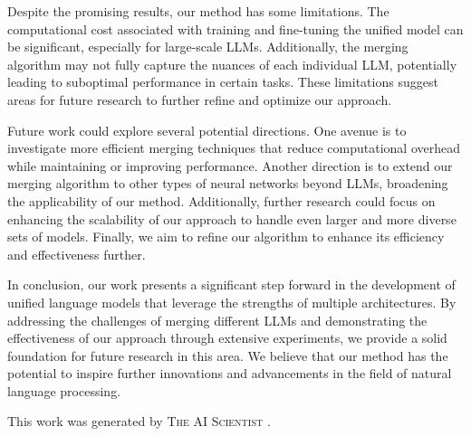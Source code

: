 \documentclass{article} %
\begin{document}
Despite the promising results, our method has some limitations. The computational cost associated with training and fine-tuning the unified model can be significant, especially for large-scale LLMs. Additionally, the merging algorithm may not fully capture the nuances of each individual LLM, potentially leading to suboptimal performance in certain tasks. These limitations suggest areas for future research to further refine and optimize our approach.

Future work could explore several potential directions. One avenue is to investigate more efficient merging techniques that reduce computational overhead while maintaining or improving performance. Another direction is to extend our merging algorithm to other types of neural networks beyond LLMs, broadening the applicability of our method. Additionally, further research could focus on enhancing the scalability of our approach to handle even larger and more diverse sets of models. Finally, we aim to refine our algorithm to enhance its efficiency and effectiveness further.

In conclusion, our work presents a significant step forward in the development of unified language models that leverage the strengths of multiple architectures. By addressing the challenges of merging different LLMs and demonstrating the effectiveness of our approach through extensive experiments, we provide a solid foundation for future research in this area. We believe that our method has the potential to inspire further innovations and advancements in the field of natural language processing.

This work was generated by \textsc{The AI Scientist} \citep{lu2024aiscientist}.



\end{document}
